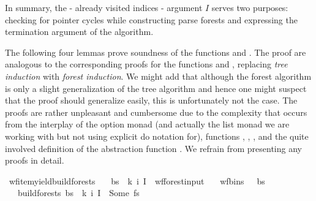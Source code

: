 \begin{isabellebody}
\begin{isamarkuptext}
In summary, the - already visited indices - argument $I$ serves two purposes: checking for pointer cycles while
constructing parse forests and expressing the termination argument of the algorithm.%
\end{isamarkuptext}\isamarkuptrue%
%
\isadelimdocument
%
\endisadelimdocument
%
\isatagdocument
%
\isamarkuptrue%
%
\endisatagdocument
{\isafolddocument}%
%
\isadelimdocument
%
\endisadelimdocument
%
\begin{isamarkuptext}%
The following four lemmas prove soundness of the functions  and .
The proof are analogous to the corresponding proofs for the functions  and ,
replacing \textit{tree induction} with \textit{forest induction}. We might add that although the forest algorithm
is only a slight generalization of the tree algorithm and hence one might suspect that the proof should generalize
easily, this is unfortunately not the case. The proofs are rather unpleasant and cumbersome due to the complexity
that occurs from the interplay of the option monad (and actually the list monad we are working with but not using explicit do notation for), functions , ,
, and the quite involved definition of the abstraction function . We refrain from
presenting any proofs in detail.%
\end{isamarkuptext}\isamarkuptrue%
\isamarkupfalse%
\ wf{\isacharunderscore}{\kern0pt}item{\isacharunderscore}{\kern0pt}yield{\isacharunderscore}{\kern0pt}build{\isacharunderscore}{\kern0pt}forests{\isacharprime}{\kern0pt}{\isacharcolon}{\kern0pt}\isanewline
\ \ \ {\isachardoublequoteopen}{\isacharparenleft}{\kern0pt}bs{\isacharcomma}{\kern0pt}\ {\isasymomega}{\isacharcomma}{\kern0pt}\ k{\isacharcomma}{\kern0pt}\ i{\isacharcomma}{\kern0pt}\ I{\isacharparenright}{\kern0pt}\ {\isasymin}\ wf{\isacharunderscore}{\kern0pt}forest{\isacharunderscore}{\kern0pt}input{\isachardoublequoteclose}\isanewline
\ \ \ {\isachardoublequoteopen}wf{\isacharunderscore}{\kern0pt}bins\ {\isasymG}\ {\isasymomega}\ bs{\isachardoublequoteclose}\isanewline
\ \ \ {\isachardoublequoteopen}build{\isacharunderscore}{\kern0pt}forests{\isacharprime}{\kern0pt}\ bs\ {\isasymomega}\ k\ i\ I\ {\isacharequal}{\kern0pt}\ Some\ fs{\isachardoublequoteclose}\isanewline

\end{isabellebody}
